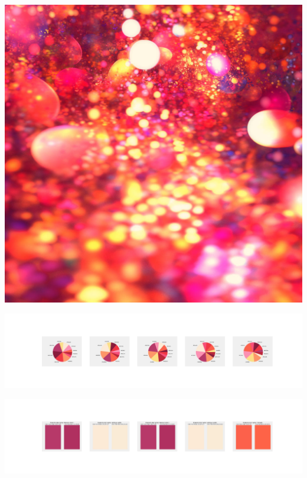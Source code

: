 \documentclass[11pt]{article}
\begin{document}
\begin{landscape}
    \begin{center}
    \includegraphics[width=\textwidth]{./nbimg/file (175).jpg}
    \end{center}

    \begin{center}
    \includegraphics[width=250mm]{./nbimg/pie-84.jpg}
    \end{center}

    \begin{center}
    \includegraphics[width=250mm]{./nbimg/peak-84.jpg}
    \end{center}
    


\end{landscape}
\end{document}
